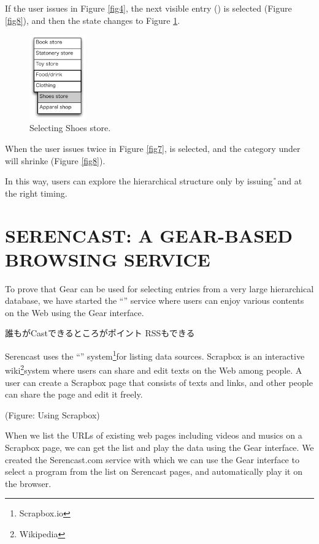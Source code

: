 \documentclass{article}
\begin{document}
If the user issues {\D} in Figure \ref{fig4}, the next visible entry
() is selected (Figure \ref{fig8}), and then the state changes to Figure \ref{fig9}.

\begin{figure}[H]
\centerline{\includegraphics[width=24mm,bb=0 0 139 211]{figures/fig9.pdf}}
\caption{Selecting Shoes store.}
\label{fig9}
\end{figure}

When the user issues {\D} twice in Figure \ref{fig7},
 is selected, and the category under  will shrinke (Figure \ref{fig8}).

In this way, users can explore the hierarchical structure
only by issuing {\U} and {\D} at the right timing.

\section{SERENCAST: A GEAR-BASED BROWSING SERVICE}


To prove that Gear can be used for selecting entries from a very
large hierarchical database,
we have started the ``'' service where
users can enjoy various contents on the Web using the Gear interface.

誰もがCastできるところがポイント
RSSもできる

Serencast uses the ``'' system\footnote{
  Scrapbox.io
}for listing data sources.
Scrapbox is an interactive wiki\footnote{
 Wikipedia
}system where users can share and edit texts on the Web among people.
A user can create a Scrapbox page that consists of texts and links,
and other people can share the page and edit it freely.

(Figure: Using Scrapbox)

When we list the URLs of existing web pages including
videos and musics on a Scrapbox page, we can get the list and play the
data using the Gear interface.  We created the Serencast.com service
with which we can use the Gear interface to select a program from the
list on Serencast pages, and automatically play it on the browser.
\end{document}
